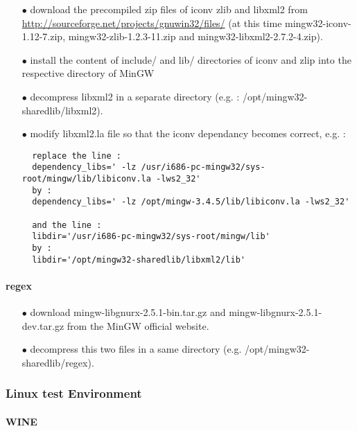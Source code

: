 \documentclass[11pt]{article}
\begin{document}
\begin{itemize}
\item[$\bullet$]  download the precompiled zip files of iconv zlib and libxml2 from \url{http://sourceforge.net/projects/gnuwin32/files/} (at this time mingw32-iconv-1.12-7.zip, mingw32-zlib-1.2.3-11.zip and mingw32-libxml2-2.7.2-4.zip).
\item[$\bullet$]  install the content of include/ and lib/ directories of iconv and zlip into the respective directory of MinGW
\item[$\bullet$]  decompress libxml2 in a separate directory (e.g. : /opt/mingw32-sharedlib/libxml2).
\item[$\bullet$]  modify libxml2.la file so that the iconv dependancy becomes correct, e.g. :
\begin{verbatim}
  replace the line :
  dependency_libs=' -lz /usr/i686-pc-mingw32/sys-root/mingw/lib/libiconv.la -lws2_32'
  by :
  dependency_libs=' -lz /opt/mingw-3.4.5/lib/libiconv.la -lws2_32'

  and the line :
  libdir='/usr/i686-pc-mingw32/sys-root/mingw/lib'
  by :
  libdir='/opt/mingw32-sharedlib/libxml2/lib'
\end{verbatim}
\end{itemize}


\paragraph{regex}

\begin{itemize}
\item[$\bullet$]  download mingw-libgnurx-2.5.1-bin.tar.gz and mingw-libgnurx-2.5.1-dev.tar.gz from the MinGW official website.

\item[$\bullet$]  decompress this two files in a same directory (e.g. /opt/mingw32-sharedlib/regex).
\end{itemize}



\subsubsection{Linux test Environment}

\paragraph{WINE}
\end{document}
